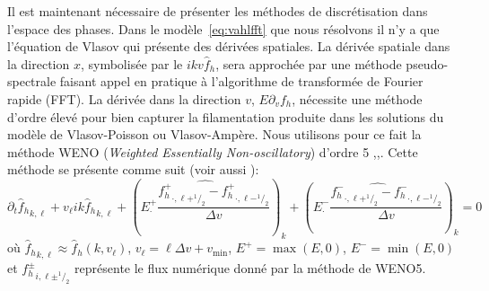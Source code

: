 Il est maintenant nécessaire de présenter les méthodes de discrétisation dans l'espace des phases. Dans le modèle~\eqref{eq:vahlfft} que nous résolvons il n'y a que l'équation de Vlasov qui présente des dérivées spatiales. La dérivée spatiale dans la direction $x$, symbolisée par le $ikv\hat{f}_h$, sera approchée par une méthode pseudo-spectrale faisant appel en pratique à l'algorithme de transformée de Fourier rapide (FFT). La dérivée dans la direction $v$, $E\partial_v f_h$, nécessite une méthode d'ordre élevé pour bien capturer la filamentation produite dans les solutions du modèle de Vlasov-Poisson ou Vlasov-Ampère. Nous utilisons pour ce fait la méthode WENO (\emph{Weighted Essentially Non-oscillatory}) d'ordre 5 \cite{Shu:2003},\cite{Liu:1994},\cite{Wang:2007}. Cette méthode se présente comme suit (voir aussi \cite{Crouseilles:2019b}):
$$
  \partial_t \left.\hat{f}_h\right._{k,\ell}
  + v_\ell ik\left.\hat{f}_h\right._{k,\ell}
  + \left(\widehat{ E_\cdot^+ \frac{\left.f^+_h\right._{\cdot,\ell+^1/_2}-\left.f^+_h\right._{\cdot,\ell-^1/_2}}{\Delta v} }\right)_k
  + \left(\widehat{ E_\cdot^- \frac{\left.f^-_h\right._{\cdot,\ell+^1/_2}-\left.f^-_h\right._{\cdot,\ell-^1/_2}}{\Delta v} }\right)_k
  = 0
$$
où $\left.\hat{f}_h\right._{k,\ell} \approx \left.\hat{f}_h\right.(k,v_\ell)$, $v_\ell = \ell\Delta v + v_{\text{min}}$, $E^+ = \max(E,0)$, $E^- = \min(E,0)$ et ${f^\pm_h}_{i,\ell\pm^1/_2}$ représente le flux numérique donné par la méthode de WENO5.

